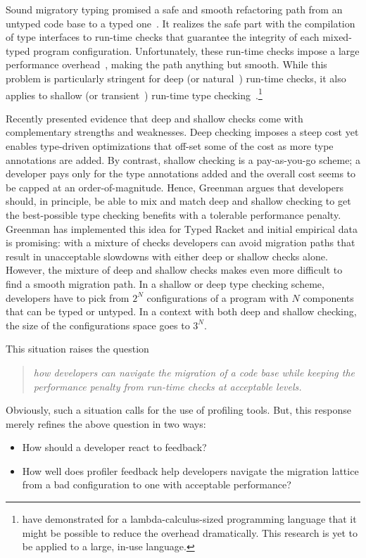 
Sound migratory typing promised a safe and smooth refactoring path from an
untyped code base to a typed one~\cite{tf-dls-2006, tfffgksst-snapl-2017}. It
realizes the safe part with the compilation of type interfaces to run-time
checks that guarantee the integrity of each mixed-typed program configuration.
Unfortunately, these run-time checks impose a large performance
overhead~\cite{gtnffvf-jfp-2019}, making the path anything but smooth. While
this problem is particularly stringent for deep (or natural~\cite{tf-dls-2006,
tf-popl-2008, st-sfp-2006}) run-time checks, it also applies to shallow (or
transient~\cite{vss-popl-2017,vksb-dls-2014,v-thesis-2019}) run-time type
checking~\cite{gm-pepm-2018}.\footnote{\citet{kas-pldi-2019} have demonstrated
for a lambda-calculus-sized programming language that it might be possible to
reduce the overhead dramatically. This research is yet to be applied to a large,
in-use language.}

Recently \citet{g-thesis-2020,g-deep-shallow} presented evidence that deep and
shallow checks come with complementary strengths and weaknesses. Deep checking
imposes a steep cost yet enables type-driven optimizations that off-set some of
the cost as more type annotations are added. By contrast, shallow checking is a
pay-as-you-go scheme; a developer pays only for the type annotations added and
the overall cost seems to be capped at an order-of-magnitude. Hence, Greenman
argues that developers should, in principle, be able to mix and match deep and
shallow checking to get the best-possible type checking benefits with a
tolerable performance penalty.  Greenman has implemented this idea for Typed
Racket and initial empirical data is promising: with a mixture of checks
developers can avoid migration paths that result in unacceptable slowdowns with
either deep or shallow checks alone.  However, the mixture of deep and shallow
checks makes even more difficult to find a smooth migration path. In a shallow
or deep type checking scheme, developers have to pick from $2^N$ configurations
of a program with $N$ components that can be typed or untyped. In a context with
both deep and shallow checking, the size of the configurations space goes to
$3^N$.

This situation raises the question 
\begin{quote} \em
 how developers can navigate the migration of a code base while keeping the
 performance penalty from run-time checks at acceptable levels.
\end{quote}  
Obviously, such a situation calls for the use of profiling tools. But, this
response merely refines the above question in two ways: 
\begin{itemize} \em

\item How should a developer react to feedback?

\item How well does profiler feedback help developers navigate the migration
lattice from a bad configuration to one with acceptable performance?

\end{itemize}   

